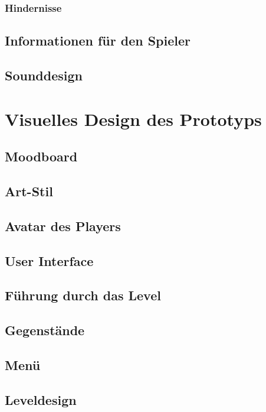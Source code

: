 \subsection{Hindernisse}

\section{Informationen für den Spieler}

\section{Sounddesign}

\chapter{Visuelles Design des Prototyps}

\section{Moodboard}

\section{Art-Stil}

\section{Avatar des Players}

\section{User Interface}

\section{Führung durch das Level}

\section{Gegenstände}

\section{Menü}

\section{Leveldesign}

